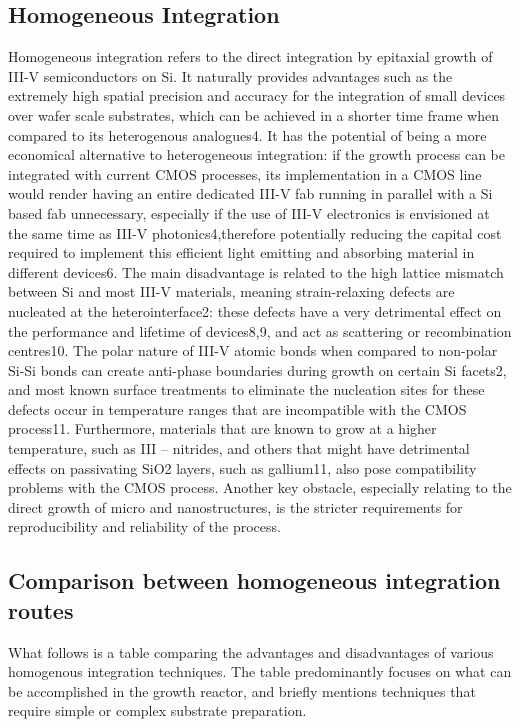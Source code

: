 \subsection{Homogeneous Integration}
Homogeneous integration refers to the direct integration by epitaxial growth of III-V semiconductors on Si. 
It naturally provides advantages such as the extremely high spatial precision and accuracy for the integration of small devices over wafer scale substrates, which can be achieved in a shorter time frame when compared to its heterogenous analogues4. It has the potential of being a more economical alternative to heterogeneous integration: if the growth process can be integrated with current CMOS processes, its implementation in a CMOS line would render having an entire dedicated III-V fab running in parallel with a Si based fab unnecessary, especially if the use of III-V electronics is envisioned at the same time as III-V photonics4,therefore potentially reducing the capital cost required to implement this efficient light emitting and absorbing material in different devices6.
The main disadvantage is related to the high lattice mismatch between Si and most III-V materials, meaning strain-relaxing defects are nucleated at the heterointerface2: these defects have a very detrimental effect on the performance and lifetime of devices8,9, and act as scattering or recombination centres10. The polar nature of III-V atomic bonds when compared to non-polar Si-Si bonds can create anti-phase boundaries during growth on certain Si facets2, and most known surface treatments to eliminate the nucleation sites for these defects occur in temperature ranges that are incompatible with the CMOS process11. Furthermore, materials that are known to grow at a higher temperature, such as III – nitrides, and others that might have detrimental effects on passivating SiO2 layers, such as gallium11, also pose compatibility problems with the CMOS process. Another key obstacle, especially relating to the direct growth of micro and nanostructures, is the stricter requirements for reproducibility and reliability of the process.
\subsection{Comparison between homogeneous integration routes}
What follows is a table comparing the advantages and disadvantages of various homogenous integration techniques. The table predominantly focuses on what can be accomplished in the growth reactor, and briefly mentions techniques that require simple or complex substrate preparation.


